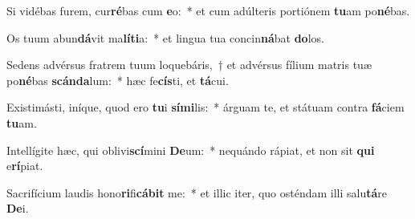 \item Si vidébas furem, cur\textbf{ré}bas cum \textbf{e}o:~* et cum adúlteris portiónem \textbf{tu}am po\textbf{né}bas.
\item Os tuum abun\textbf{dá}vit ma\textbf{lí}\textbf{ti}a:~* et lingua tua concin\textbf{ná}bat \textbf{do}los.
\item Sedens advérsus fratrem tuum loquebáris,~† et advérsus fílium matris tuæ po\textbf{né}bas \textbf{scán}\textbf{da}lum:~* hæc fe\textbf{cís}ti, et \textbf{tá}cui.
\item Existimásti, iníque, quod ero \textbf{tu}i \textbf{sí}\textbf{mi}lis:~* árguam te, et státuam contra \textbf{fá}ciem \textbf{tu}am.
\item Intellígite hæc, qui oblivi\textbf{scí}mini \textbf{De}um:~* nequándo rápiat, et non sit \textbf{qui} e\textbf{rí}piat.
\item Sacrifícium laudis hono\textbf{ri}fi\textbf{cá}\textbf{bit} me:~* et illic iter, quo osténdam illi salu\textbf{tá}re \textbf{De}i.
